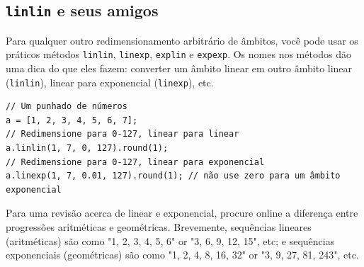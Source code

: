 \subsection{\texttt{linlin} e seus amigos}

Para qualquer outro redimensionamento arbitrário de âmbitos, você pode usar os práticos métodos \texttt{linlin}, \texttt{linexp}, \texttt{explin} e \texttt{expexp}. Os nomes nos métodos dão uma dica do que eles fazem: converter um âmbito linear em outro âmbito linear (\texttt{linlin}), linear para exponencial (\texttt{linexp}), etc.

\begin{lstlisting}[style=SuperCollider-IDE, basicstyle=\scttfamily\footnotesize]
// Um punhado de números
a = [1, 2, 3, 4, 5, 6, 7];
// Redimensione para 0-127, linear para linear
a.linlin(1, 7, 0, 127).round(1);
// Redimensione para 0-127, linear para exponencial
a.linexp(1, 7, 0.01, 127).round(1); // não use zero para um âmbito exponencial
\end{lstlisting}

Para uma revisão acerca de linear e exponencial, procure online a diferença entre progressões aritméticas e geométricas. Brevemente, sequências lineares (aritméticas) são como "1, 2, 3, 4, 5, 6" or "3, 6, 9, 12, 15", etc; e sequências exponenciais (geométricas) são como "1, 2, 4, 8, 16, 32" or "3, 9, 27, 81, 243", etc.



